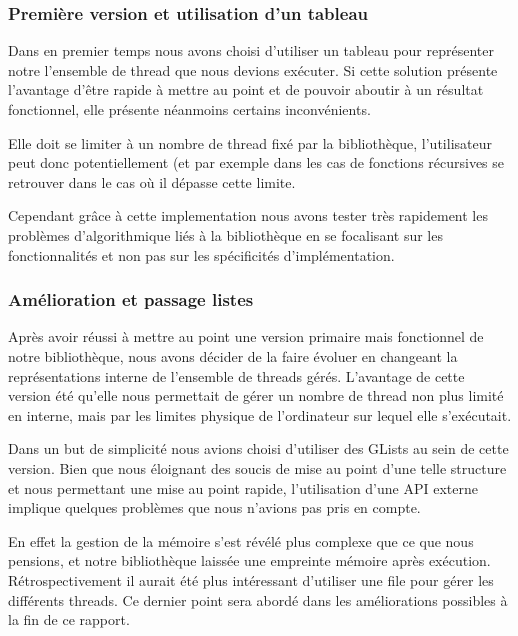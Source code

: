 \documentclass{article}
\begin{document}
			\subsubsection{Première version et utilisation d'un tableau}
			Dans en premier temps nous avons choisi d'utiliser un
            tableau pour représenter notre l'ensemble de thread que
            nous devions exécuter.  Si cette solution présente
            l'avantage d'être rapide à mettre au point et de pouvoir
            aboutir à un résultat fonctionnel, elle présente néanmoins
            certains inconvénients.
			
			Elle doit se limiter à un nombre de thread fixé par la
            bibliothèque, l'utilisateur peut donc potentiellement (et
            par exemple dans les cas de fonctions récursives se
            retrouver dans le cas où il dépasse cette limite.
			
			Cependant grâce à cette implementation nous avons tester
            très rapidement les problèmes d'algorithmique liés à la
            bibliothèque en se focalisant sur les fonctionnalités et
            non pas sur les spécificités d'implémentation.

			\subsubsection{Amélioration et passage listes}
			Après avoir réussi à mettre au point une version primaire
            mais fonctionnel de notre bibliothèque, nous avons décider
            de la faire évoluer en changeant la représentations
            interne de l'ensemble de threads gérés.  L'avantage de
            cette version été qu'elle nous permettait de gérer un
            nombre de thread non plus limité en interne, mais par les
            limites physique de l'ordinateur sur lequel elle
            s'exécutait.
			
			Dans un but de simplicité nous avions choisi d'utiliser
            des GLists au sein de cette version. Bien que nous
            éloignant des soucis de mise au point d'une telle
            structure et nous permettant une mise au point rapide,
            l'utilisation d'une API externe implique quelques
            problèmes que nous n'avions pas pris en compte.
			
			En effet la gestion de la mémoire s'est révélé plus
            complexe que ce que nous pensions, et notre bibliothèque
            laissée une empreinte mémoire après exécution.
            Rétrospectivement il aurait été plus intéressant
            d'utiliser une file pour gérer les différents threads. Ce
            dernier point sera abordé dans les améliorations possibles
            à la fin de ce rapport.
			
\end{document}
